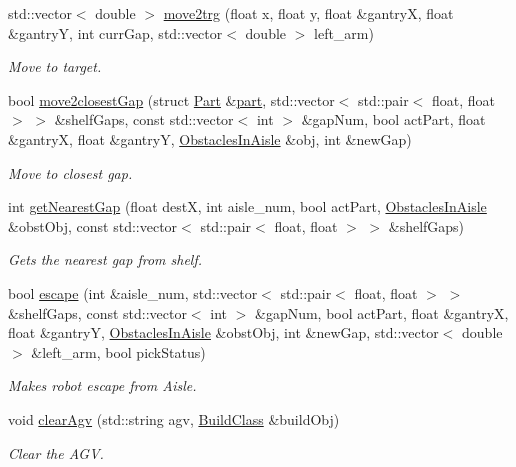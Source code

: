 \begin{DoxyCompactItemize}
std\+::vector$<$ double $>$ \hyperlink{classGantryControl_aa3b48219dcba01f5608c6a4d9ff447e9}{move2trg} (float x, float y, float \&gantryX, float \&gantryY, int curr\+Gap, std\+::vector$<$ double $>$ left\+\_\+arm)
\begin{DoxyCompactList}\small\item\em Move to target. \end{DoxyCompactList}\item 
bool \hyperlink{classGantryControl_aa6ba7baf102ac7e39d68b2ae2492f9a5}{move2closest\+Gap} (struct \hyperlink{structPart}{Part} \&\hyperlink{utils_8h_a67ee3a5b9091664130eca8efc8b97ab9}{part}, std\+::vector$<$ std\+::pair$<$ float, float $>$ $>$ \&shelf\+Gaps, const std\+::vector$<$ int $>$ \&gap\+Num, bool act\+Part, float \&gantryX, float \&gantryY, \hyperlink{classObstaclesInAisle}{Obstacles\+In\+Aisle} \&obj, int \&new\+Gap)
\begin{DoxyCompactList}\small\item\em Move to closest gap. \end{DoxyCompactList}\item 
int \hyperlink{classGantryControl_ab475e912ab1ea0d13efc10078695102e}{get\+Nearest\+Gap} (float destX, int aisle\+\_\+num, bool act\+Part, \hyperlink{classObstaclesInAisle}{Obstacles\+In\+Aisle} \&obst\+Obj, const std\+::vector$<$ std\+::pair$<$ float, float $>$ $>$ \&shelf\+Gaps)
\begin{DoxyCompactList}\small\item\em Gets the nearest gap from shelf. \end{DoxyCompactList}\item 
bool \hyperlink{classGantryControl_aa014dd433af4fc580d38639c6353e7b8}{escape} (int \&aisle\+\_\+num, std\+::vector$<$ std\+::pair$<$ float, float $>$ $>$ \&shelf\+Gaps, const std\+::vector$<$ int $>$ \&gap\+Num, bool act\+Part, float \&gantryX, float \&gantryY, \hyperlink{classObstaclesInAisle}{Obstacles\+In\+Aisle} \&obst\+Obj, int \&new\+Gap, std\+::vector$<$ double $>$ \&left\+\_\+arm, bool pick\+Status)
\begin{DoxyCompactList}\small\item\em Makes robot escape from Aisle. \end{DoxyCompactList}\item 
void \hyperlink{classGantryControl_ad7df230473058728ad07804a3d6d1b4c}{clear\+Agv} (std\+::string agv, \hyperlink{classBuildClass}{Build\+Class} \&build\+Obj)
\begin{DoxyCompactList}\small\item\em Clear the A\+GV. \end{DoxyCompactList}\item 

\end{DoxyCompactItemize}
